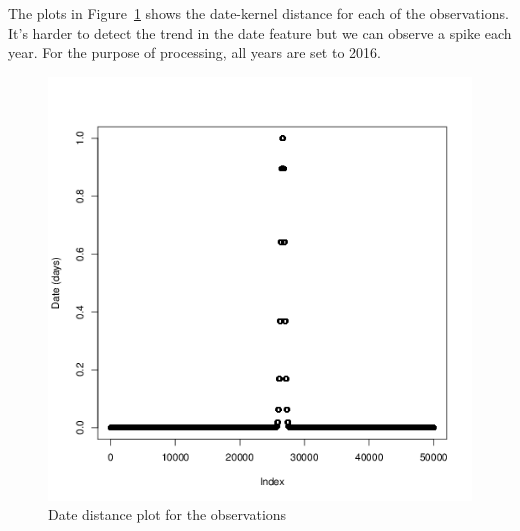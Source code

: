 \documentclass[a4paper, twocolumn]{article}
\begin{document}
    The plots in Figure~\ref{fig:date} shows the date-kernel distance for each of the observations. It's harder to detect the trend in the date feature but we can observe a spike each year. For the purpose of processing, all years are set to 2016.
    \begin{figure}[H]
    \centering
        \caption{Date distance plot for the observations}\label{fig:date}
	    \begin{minipage}[]{0.32\textwidth}
	    	\includegraphics[width=\textwidth]{share/1_date.png}
	    \end{minipage}
    \end{figure}
\end{document}
